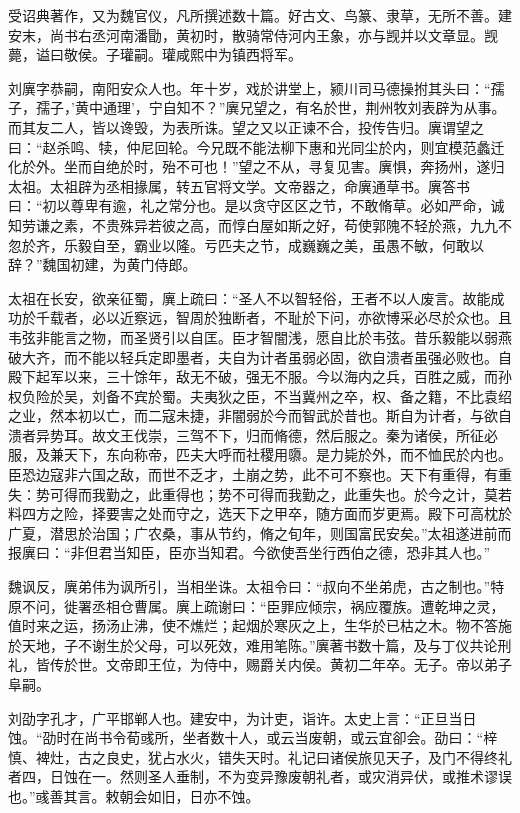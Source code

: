 \documentclass[12pt,UTF8]{ctexbook}
\begin{document}
受诏典著作，又为魏官仪，凡所撰述数十篇。好古文、鸟篆、隶草，无所不善。建安末，尚书右丞河南潘勖，黄初时，散骑常侍河内王象，亦与觊并以文章显。觊薨，谥曰敬侯。子瓘嗣。瓘咸熙中为镇西将军。

刘廙字恭嗣，南阳安众人也。年十岁，戏於讲堂上，颍川司马德操拊其头曰：“孺子，孺子，'黄中通理'，宁自知不？”廙兄望之，有名於世，荆州牧刘表辟为从事。而其友二人，皆以谗毁，为表所诛。望之又以正谏不合，投传告归。廙谓望之曰：“赵杀鸣、犊，仲尼回轮。今兄既不能法柳下惠和光同尘於内，则宜模范蠡迁化於外。坐而自绝於时，殆不可也！”望之不从，寻复见害。廙惧，奔扬州，遂归太祖。太祖辟为丞相掾属，转五官将文学。文帝器之，命廙通草书。廙答书曰：“初以尊卑有逾，礼之常分也。是以贪守区区之节，不敢脩草。必如严命，诚知劳谦之素，不贵殊异若彼之高，而惇白屋如斯之好，苟使郭隗不轻於燕，九九不忽於齐，乐毅自至，霸业以隆。亏匹夫之节，成巍巍之美，虽愚不敏，何敢以辞？”魏国初建，为黄门侍郎。

太祖在长安，欲亲征蜀，廙上疏曰：“圣人不以智轻俗，王者不以人废言。故能成功於千载者，必以近察远，智周於独断者，不耻於下问，亦欲博采必尽於众也。且韦弦非能言之物，而圣贤引以自匡。臣才智闇浅，愿自比於韦弦。昔乐毅能以弱燕破大齐，而不能以轻兵定即墨者，夫自为计者虽弱必固，欲自溃者虽强必败也。自殿下起军以来，三十馀年，敌无不破，强无不服。今以海内之兵，百胜之威，而孙权负险於吴，刘备不宾於蜀。夫夷狄之臣，不当冀州之卒，权、备之籍，不比袁绍之业，然本初以亡，而二寇未捷，非闇弱於今而智武於昔也。斯自为计者，与欲自溃者异势耳。故文王伐崇，三驾不下，归而脩德，然后服之。秦为诸侯，所征必服，及兼天下，东向称帝，匹夫大呼而社稷用隳。是力毙於外，而不恤民於内也。臣恐边寇非六国之敌，而世不乏才，土崩之势，此不可不察也。天下有重得，有重失：势可得而我勤之，此重得也；势不可得而我勤之，此重失也。於今之计，莫若料四方之险，择要害之处而守之，选天下之甲卒，随方面而岁更焉。殿下可高枕於广夏，潜思於治国；广农桑，事从节约，脩之旬年，则国富民安矣。”太祖遂进前而报廙曰：“非但君当知臣，臣亦当知君。今欲使吾坐行西伯之德，恐非其人也。”

魏讽反，廙弟伟为讽所引，当相坐诛。太祖令曰：“叔向不坐弟虎，古之制也。”特原不问，徙署丞相仓曹属。廙上疏谢曰：“臣罪应倾宗，祸应覆族。遭乾坤之灵，值时来之运，扬汤止沸，使不燋烂；起烟於寒灰之上，生华於已枯之木。物不答施於天地，子不谢生於父母，可以死效，难用笔陈。”廙著书数十篇，及与丁仪共论刑礼，皆传於世。文帝即王位，为侍中，赐爵关内侯。黄初二年卒。无子。帝以弟子阜嗣。

刘劭字孔才，广平邯郸人也。建安中，为计吏，诣许。太史上言：“正旦当日蚀。“劭时在尚书令荀彧所，坐者数十人，或云当废朝，或云宜卻会。劭曰：“梓慎、裨灶，古之良史，犹占水火，错失天时。礼记曰诸侯旅见天子，及门不得终礼者四，日蚀在一。然则圣人垂制，不为变异豫废朝礼者，或灾消异伏，或推术谬误也。”彧善其言。敕朝会如旧，日亦不蚀。
\end{document}
